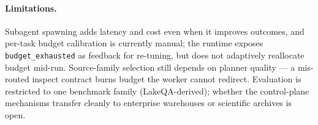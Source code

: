 \paragraph{Limitations.} Subagent spawning adds latency and cost even when it improves outcomes, and per-task budget calibration is currently manual; the runtime exposes \texttt{budget\_exhausted} as feedback for re-tuning, but does not adaptively reallocate budget mid-run. Source-family selection still depends on planner quality --- a mis-routed inspect contract burns budget the worker cannot redirect. Evaluation is restricted to one benchmark family (LakeQA-derived); whether the control-plane mechanisms transfer cleanly to enterprise warehouses or scientific archives is open.
